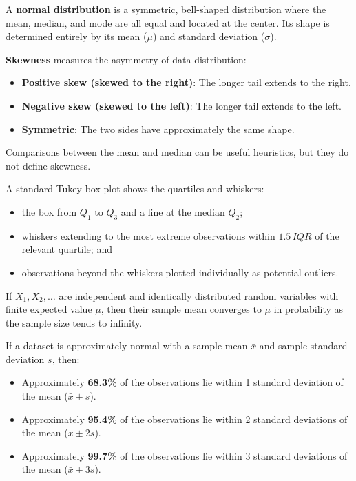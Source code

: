 \begin{definition}
A \textbf{normal distribution} is a symmetric, bell-shaped distribution where the mean, median, and mode are all equal and located at the center. Its shape is determined entirely by its mean ($\mu$) and standard deviation ($\sigma$).
\end{definition}

\begin{definition}[Skewness]
    \textbf{Skewness} measures the asymmetry of data distribution:
    \begin{itemize}
        \item \textbf{Positive skew (skewed to the right)}: The longer tail extends to the right.
        \item \textbf{Negative skew (skewed to the left)}: The longer tail extends to the left.
        \item \textbf{Symmetric}: The two sides have approximately the same shape.
    \end{itemize}
    Comparisons between the mean and median can be useful heuristics, but they do not define skewness.
\end{definition}

\begin{definition}
A standard Tukey box plot shows the quartiles and whiskers:
\begin{itemize}
    \item the box from $Q_1$ to $Q_3$ and a line at the median $Q_2$;
    \item whiskers extending to the most extreme observations within $1.5\,IQR$ of the relevant quartile; and
    \item observations beyond the whiskers plotted individually as potential outliers.
\end{itemize}
\end{definition}

\begin{theorem}
    If $X_1,X_2,\ldots$ are independent and identically distributed random variables with finite expected value $\mu$, then their sample mean converges to $\mu$ in probability as the sample size tends to infinity.
\end{theorem}

\begin{theorem}
If a dataset is approximately normal with a sample mean $\bar{x}$ and sample standard deviation $s$, then:
\begin{itemize}
    \item Approximately \textbf{68.3\%} of the observations lie within 1 standard deviation of the mean ($\bar{x} \pm s$).
    \item Approximately \textbf{95.4\%} of the observations lie within 2 standard deviations of the mean ($\bar{x} \pm 2s$).
    \item Approximately \textbf{99.7\%} of the observations lie within 3 standard deviations of the mean ($\bar{x} \pm 3s$).
\end{itemize}
\end{theorem}

